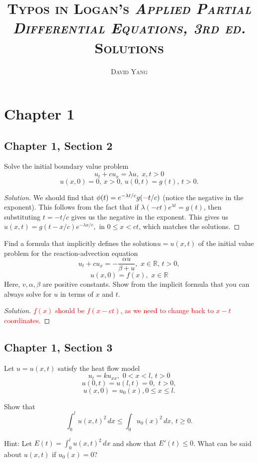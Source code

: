 \documentclass[11pt]{article}
\newenvironment{solution}
  {\renewcommand\qedsymbol{$\blacksquare$}\begin{proof}[Solution]}
  {\end{proof}}
\begin{document}
\title{\large	{\textsc{Typos in Logan's \textit{Applied Partial Differential Equations, 3rd ed.} Solutions}}}
\author{\textsc{David Yang}}
\date{}
\maketitle

\setcounter{tocdepth}{2}

\tableofcontents
\newpage
\vspace{1em}

\section{Chapter 1}
\setcounter{subsection}{1}
\subsection{Chapter 1, Section 2}
\begin{exercise}{7} Solve the initial boundary value problem \[u_t+cu_x = \lambda u, \, \, x, t > 0 \]
\[u(x,0)=0, \, x>0, \, u(0,t)=g(t), \, t > 0.\]
\end{exercise}

\begin{solution}
We should find that $\phi(t) = e^{-\lambda t/c} g(\textcolor{red}{-}t/c)$ (notice the negative in the exponent). This follows from the fact that if $\lambda(-ct)e^{\lambda t} = g(t)$, then substituting $t = -t/c$ gives us the negative in the exponent.
This gives us $u(x, t) = g(t-x/c)e^{-\lambda x/c},$ in $0 \leq x < ct$, which matches the solutions.
\end{solution}

\begin{exercise}{12} Find a formula that implicitly defines the solution$ u = u(x, t)$ of the initial value problem for the reaction-advection equation
\[ u_t + cu_x = -\frac{\alpha u}{\beta + u}, \, \, x \in \mathbb{R}, \, t > 0, \] 
\[ u(x,0) = f(x), \, \, x \in \mathbb{R} \]
  Here, $v, \alpha, \beta$ are positive constants. Show from the implicit formula that you can always solve for $u$ in terms of $x$ and $t$.
  \end{exercise}
  
  \begin{solution}
  \textcolor{red}{$f(x)$ should be $f(x-ct)$, as we need to change back to $x-t$ coordinates.}
  \end{solution}

\subsection{Chapter 1, Section 3}
\begin{exercise}{2}
  Let $u = u(x, t)$ satisfy the heat flow model 
  \[ u_t =ku_{xx}, \, \, 0<x<l, \, t>0 \]
  \[ u(0,t) = u(l,t) = 0, \, \, t > 0,\]
  \[ u(x,0)=u_0(x), 0 \leq x \leq l.\] 
  
  Show that
  \[ \int_0^l u(x, t)^2 \, dx \leq \int_0 u_0(x)^2 \, dx, \, t \geq 0. \]
  
  Hint: Let $E(t) = \int_0^l u(x, t)^2 \, dx$ and show that $E'(t) \leq 0$. What can be said about $u(x, t)$ if $u_0(x) = 0$?
\end{exercise}
\end{document}
